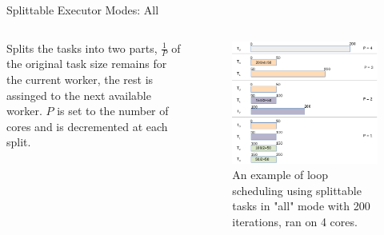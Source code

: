 \documentclass[10pt]{beamer}
\begin{document}
\begin{frame}{Splittable Executor Modes: All}
	\begin{outline}
					
		\begin{columns}		
	{Splits the tasks into two parts, $\frac{1}{P}$ of the original task size remains for the current worker, the rest is assinged to the next available worker. $P$ is set to the number of cores and is decremented at each split.}
\begin{figure}[]
	\includegraphics[width=0.98\linewidth]{images/spt_all.png}
	\caption{An example of loop scheduling using splittable tasks in "all" mode with 200 iterations, ran on 4 cores.}
	\end{figure}
		
	\end{columns}
			
		\end{outline}
	\end{frame}
\end{document}
